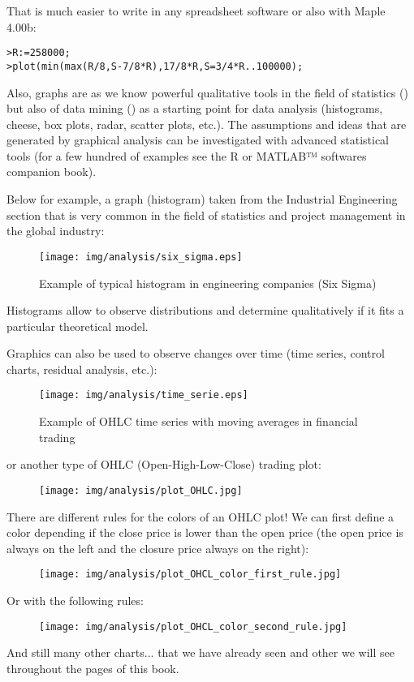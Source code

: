 	That is much easier to write in any spreadsheet software or also with Maple 4.00b:

\texttt{>R:=258000;}\\
\texttt{>plot(min(max(R/8,S-7/8*R),17/8*R,S=3/4*R..100000);}

	Also, graphs are as we know powerful qualitative tools in the field of statistics () but also of data mining () as a starting point for data analysis (histograms, cheese, box plots, radar, scatter plots, etc.). The assumptions and ideas that are generated by graphical analysis can be investigated with advanced statistical tools (for a few hundred of examples see the R  or MATLAB™ softwares companion book).

Below for example, a graph (histogram) taken from the Industrial Engineering section that is very common in the field of statistics and project management in the global industry:

\begin{figure}[H]
\centering
\texttt{[image: img/analysis/six\_sigma.eps]}
\caption{Example of typical histogram in engineering companies (Six Sigma)}
\end{figure}

Histograms allow to observe distributions and determine qualitatively if it fits a particular theoretical model.

Graphics can also be used to observe changes over time (time series, control charts, residual analysis, etc.):

\begin{figure}[H]
\centering
\texttt{[image: img/analysis/time\_serie.eps]}
\caption{Example of OHLC time series with moving averages in financial trading}
\end{figure}
or another type of OHLC (Open-High-Low-Close) trading plot:
\begin{figure}[H]
\centering
\texttt{[image: img/analysis/plot\_OHLC.jpg]}
\end{figure}
There are different rules for the colors of an OHLC plot! We can first define a color depending if the close price is lower than the open price (the open price is always on the left and the closure price always on the right):
\begin{figure}[H]
\centering
\texttt{[image: img/analysis/plot\_OHCL\_color\_first\_rule.jpg]}
\end{figure}
Or with the following rules:
\begin{figure}[H]
\centering
\texttt{[image: img/analysis/plot\_OHCL\_color\_second\_rule.jpg]}
\end{figure}
And still many other charts... that we have already seen and other we will see throughout the pages of this book.

